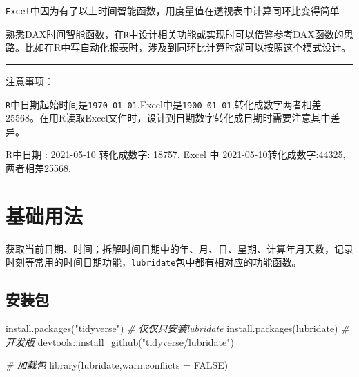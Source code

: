 \documentclass[
]{book}
\newenvironment{Shaded}{\begin{snugshade}}{\end{snugshade}}
\newcommand{\AttributeTok}[1]{\textcolor[rgb]{0.77,0.63,0.00}{#1}}
\newcommand{\CommentTok}[1]{\textcolor[rgb]{0.56,0.35,0.01}{\textit{#1}}}
\newcommand{\ConstantTok}[1]{\textcolor[rgb]{0.00,0.00,0.00}{#1}}
\newcommand{\FunctionTok}[1]{\textcolor[rgb]{0.00,0.00,0.00}{#1}}
\newcommand{\NormalTok}[1]{#1}
\newcommand{\SpecialCharTok}[1]{\textcolor[rgb]{0.00,0.00,0.00}{#1}}
\newcommand{\StringTok}[1]{\textcolor[rgb]{0.31,0.60,0.02}{#1}}
\begin{document}
\texttt{Excel}中因为有了以上时间智能函数，用度量值在透视表中计算同环比变得简单

熟悉DAX时间智能函数，在\texttt{R}中设计相关功能或实现时可以借鉴参考DAX函数的思路。比如在R中写自动化报表时，涉及到同环比计算时就可以按照这个模式设计。

\begin{center}\rule{0.5\linewidth}{0.5pt}\end{center}

注意事项：

\texttt{R}中日期起始时间是\texttt{1970-01-01},Excel中是\texttt{1900-01-01},转化成数字两者相差25568。在用R读取Excel文件时，设计到日期数字转化成日期时需要注意其中差异。

R中日期 : 2021-05-10 转化成数字: 18757,
Excel 中 2021-05-10转化成数字:44325,两者相差25568.

\hypertarget{ux57faux7840ux7528ux6cd5-1}{%
\section{基础用法}\label{ux57faux7840ux7528ux6cd5-1}}

获取当前日期、时间；拆解时间日期中的年、月、日、星期、计算年月天数，记录时刻等常用的时间日期功能，\texttt{lubridate}包中都有相对应的功能函数。

\hypertarget{ux5b89ux88c5ux5305}{%
\subsection{安装包}\label{ux5b89ux88c5ux5305}}

\begin{Shaded}
\begin{Highlighting}[]
\FunctionTok{install.packages}\NormalTok{(}\StringTok{"tidyverse"}\NormalTok{)}
\CommentTok{\# 仅仅只安装lubridate}
\FunctionTok{install.packages}\NormalTok{(}\StringTok{\textquotesingle{}lubridate\textquotesingle{}}\NormalTok{)}
\CommentTok{\# 开发版}
\NormalTok{devtools}\SpecialCharTok{::}\FunctionTok{install\_github}\NormalTok{(}\StringTok{"tidyverse/lubridate"}\NormalTok{)}
\end{Highlighting}
\end{Shaded}

\begin{Shaded}
\begin{Highlighting}[]
\CommentTok{\# 加载包}
\FunctionTok{library}\NormalTok{(lubridate,}\AttributeTok{warn.conflicts =} \ConstantTok{FALSE}\NormalTok{)}
\end{Highlighting}
\end{Shaded}
\end{document}
